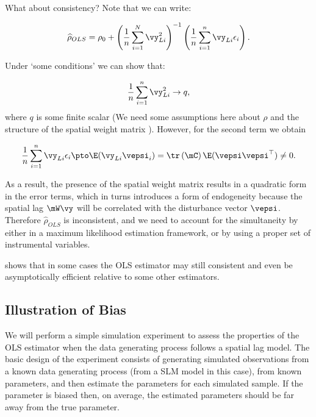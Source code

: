 \documentclass[english,12pt]{book}\usepackage[]{graphicx}\usepackage[]{xcolor}
\begin{document}
What about consistency? Note that we can write: 

\begin{equation}
          \widehat{\rho}_{OLS} = \rho_0 + \left(\frac{1}{n}\sum_{i = 1}^N \vy_{Li}^2\right)^{-1}\left(\frac{1}{n}\sum_{i = 1}^{n}\vy_{Li}\epsilon_i\right).
\end{equation}

Under `some conditions' we can show that:

\begin{equation}
\frac{1}{n}\sum_{i = 1}^n \vy_{Li}^2 \to q,
\end{equation}
%
where $q$ is some finite scalar (We need some assumptions here about $\rho$ and the structure of the spatial weight matrix ). However, for the second term we obtain

\begin{equation}
  \frac{1}{n}\sum_{i = 1}^{n}\vy_{Li}\epsilon_i \pto \E(\vy_{Li}\vepsi_i) = \tr \left(\mC\right) \E(\vepsi\vepsi^\top) \neq 0.
\end{equation}

As a result, the presence of the spatial weight matrix results in a quadratic form in the error terms, which in turns introduces a form of endogeneity because the spatial lag $\mW\vy$ will be correlated with the disturbance vector $\vepsi$. Therefore $\widehat{\rho}_{OLS}$ is inconsistent, and we need to account for the simultaneity by either in a maximum likelihood estimation framework, or by using a proper set of instrumental variables.

\begin{remark}
  \cite{lee2002consistency} shows that in some cases the OLS estimator may still consistent and even be asymptotically efficient relative to some other estimators.
\end{remark}


\subsection{Illustration of Bias}

We will perform a simple simulation experiment to assess the properties of the OLS estimator when the data generating process follows a spatial lag model. The basic design of the experiment consists of generating simulated observations from a known data generating process (from a SLM model in this case), from known parameters, and then estimate the parameters for each simulated sample. If the parameter is biased then, on average, the estimated parameters should be far away from the true parameter.
\end{document}
